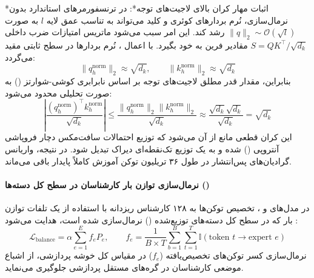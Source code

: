 *اثبات مهار کران بالای لاجیت‌های توجه*: در ترنسفورمرهای استاندارد بدون نرمال‌سازی، نُرم بردارهای کوئری و کلید می‌تواند به تناسب عمق لایه $l$ به صورت $\|q\|_2 \sim \mathcal{O}(\sqrt{l})$ رشد کند. این امر سبب می‌شود ماتریس امتیازات ضرب داخلی $S = Q K^\top / \sqrt{d_k}$ مقادیر فرین به خود بگیرد. با اعمال ، نُرم بردارها در سطح ثابتی مقید می‌گردد:
\begin{equation}
    \|q_h^{\text{norm}}\|_2 \approx \sqrt{d_k}, \qquad \|k_h^{\text{norm}}\|_2 \approx \sqrt{d_k}
\end{equation}
بنابراین، مقدار قدر مطلق لاجیت‌های توجه بر اساس نابرابری کوشی-شوارتز () به صورت تحلیلی محدود می‌شود:
\begin{equation}
    \left| \frac{(q_h^{\text{norm}})^\top k_h^{\text{norm}}}{\sqrt{d_k}} \right| \le \frac{\|q_h^{\text{norm}}\|_2 \|k_h^{\text{norm}}\|_2}{\sqrt{d_k}} \approx \frac{\sqrt{d_k} \sqrt{d_k}}{\sqrt{d_k}} = \sqrt{d_k}
\end{equation}
این کران قطعی مانع از آن می‌شود که توزیع احتمالات سافت‌مکس دچار فروپاشی آنتروپی () شده و به یک توزیع تک‌نقطه‌ای دیراک تبدیل شود. در نتیجه، واریانس گرادیان‌های پس‌انتشار در طول ۳۶ تریلیون توکن آموزش کاملاً پایدار باقی می‌ماند.

\paragraph*{نرمال‌سازی توازن بار کارشناسان در سطح کل دسته‌ها ()}
در مدل‌های  و ، تخصیص توکن‌ها به ۱۲۸ کارشناس ریزدانه با استفاده از یک تلفات توازن بار که در سطح کل دسته‌های توزیع‌شده () نرمال‌سازی شده است، هدایت می‌شود \cite{shao2024deepseekmath}:
\begin{equation}
    \mathcal{L}_{\text{balance}} = \alpha \sum_{e=1}^E f_e P_e, \qquad f_e = \frac{1}{B \times T} \sum_{b=1}^B \sum_{t=1}^T \mathbb{I}(\text{token } t \to \text{expert } e)
\end{equation}
نرمال‌سازی کسر توکن‌های تخصیص‌یافته ($f_e$) در مقیاس کل خوشه پردازشی، از اشباع موضعی کارشناسان در گره‌های مستقل پردازشی جلوگیری می‌نماید.

